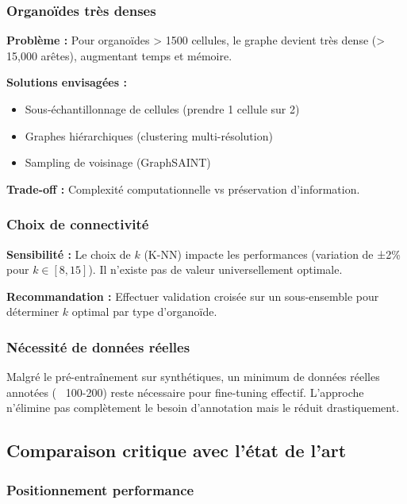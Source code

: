 \subsubsection{Organoïdes très denses}

\textbf{Problème :}
Pour organoïdes > 1500 cellules, le graphe devient très dense (> 15,000 arêtes), augmentant temps et mémoire.

\textbf{Solutions envisagées :}
\begin{itemize}
    \item Sous-échantillonnage de cellules (prendre 1 cellule sur 2)
    \item Graphes hiérarchiques (clustering multi-résolution)
    \item Sampling de voisinage (GraphSAINT)
\end{itemize}

\textbf{Trade-off :}
Complexité computationnelle vs préservation d'information.

\subsubsection{Choix de connectivité}

\textbf{Sensibilité :}
Le choix de $k$ (K-NN) impacte les performances (variation de ±2\% pour $k \in [8, 15]$). Il n'existe pas de valeur universellement optimale.

\textbf{Recommandation :}
Effectuer validation croisée sur un sous-ensemble pour déterminer $k$ optimal par type d'organoïde.

\subsubsection{Nécessité de données réelles}

Malgré le pré-entraînement sur synthétiques, un minimum de données réelles annotées (~ 100-200) reste nécessaire pour fine-tuning effectif. L'approche n'élimine pas complètement le besoin d'annotation mais le réduit drastiquement.

\subsection{Comparaison critique avec l'état de l'art}

\subsubsection{Positionnement performance}

